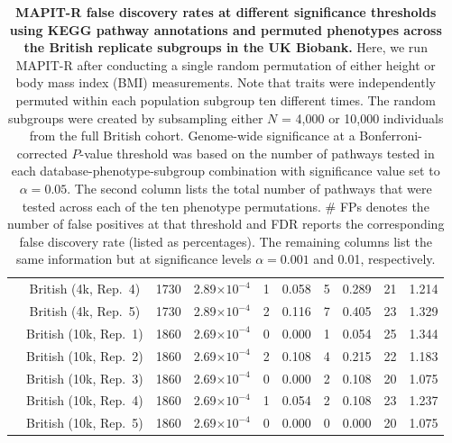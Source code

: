 \documentclass[10pt]{article}
\begin{document}
\begin{landscape}
\begin{table}[ht]
\begin{tabular}{|c|c|c|ccc|cc|cc|}
  & British (4k, Rep.~4) & 1730 & 2.89$\times 10^{-4}$ & 1 & 0.058 & 5 & 0.289 & 21 & 1.214 \\
  & British (4k, Rep.~5) & 1730 & 2.89$\times 10^{-4}$ & 2 & 0.116 & 7 & 0.405 & 23 & 1.329 \\
  & British (10k, Rep.~1) & 1860 & 2.69$\times 10^{-4}$ & 0 & 0.000 & 1 & 0.054 & 25 & 1.344 \\
  & British (10k, Rep.~2) & 1860 & 2.69$\times 10^{-4}$ & 2 & 0.108 & 4 & 0.215 & 22 & 1.183 \\
  & British (10k, Rep.~3) & 1860 & 2.69$\times 10^{-4}$ & 0 & 0.000 & 2 & 0.108 & 20 & 1.075 \\
  & British (10k, Rep.~4) & 1860 & 2.69$\times 10^{-4}$ & 1 & 0.054 & 2 & 0.108 & 23 & 1.237 \\
  & British (10k, Rep.~5) & 1860 & 2.69$\times 10^{-4}$ & 0 & 0.000 & 0 & 0.000 & 20 & 1.075 \\ 
   \hline
\end{tabular}
\caption{\textbf{MAPIT-R false discovery rates at different significance thresholds using KEGG pathway annotations and permuted phenotypes across the British replicate subgroups in the UK Biobank.} Here, we run MAPIT-R after conducting a single random permutation of either height or body mass index (BMI) measurements. Note that traits were independently permuted within each population subgroup ten different times. The random subgroups were created by subsampling either $N$ = 4,000 or 10,000 individuals from the full British cohort. Genome-wide significance at a Bonferroni-corrected $P$-value threshold was based on the number of pathways tested in each database-phenotype-subgroup combination with significance value set to $\alpha = 0.05$. The second column lists the total number of pathways that were tested across each of the ten phenotype permutations. \# FPs denotes the number of false positives at that threshold and FDR reports the corresponding false discovery rate (listed as percentages). The remaining columns list the same information but at significance levels $\alpha = 0.001$ and 0.01, respectively.}
\label{InterPath-Supp-Table-BritReps-FDRs-pt1}
\end{table}
\end{landscape}
\end{document}
